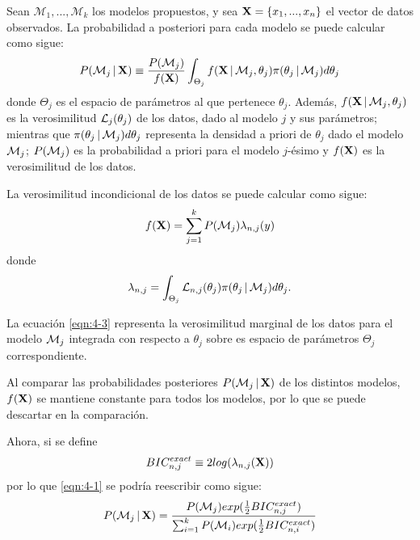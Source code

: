 Sean $\mathcal{M}_1, ..., \mathcal{M}_k$ los modelos propuestos, y sea $\textbf{X} = \lbrace x_1, ..., x_n \rbrace $ el vector de datos observados. La probabilidad a posteriori para cada modelo se puede calcular como sigue: 
\begin{equation}
P(\mathcal{M}_j \,|\, \textbf{X}) \equiv \frac{P(\mathcal{M}_j)}{f(\textbf{X})} 
  \int_{\Theta_j} f(\textbf{X} \,|\, \mathcal{M}_j, \theta_j) \pi(\theta_j \,|\, \mathcal{M}_j) d\theta_j
\label{eqn:4-1}
\end{equation}
donde $\Theta_j$ es el espacio de parámetros al que pertenece $\theta_j$. Además, $f(\textbf{X} \,|\, \mathcal{M}_j, \theta_j)$ es la verosimilitud $\mathcal{L}_{j}(\theta_j)$ de los datos, dado al modelo $j$ y sus parámetros; mientras que $ \pi(\theta_j \,|\, \mathcal{M}_j) d\theta_j$ representa la densidad a priori de $\theta_j$ dado el modelo $\mathcal{M}_j$; 
$P(\mathcal{M}_j)$ es la probabilidad a priori para el modelo $j$-ésimo y $f(\textbf{X})$ es la verosimilitud de los datos.

La verosimilitud incondicional de los datos se puede calcular como sigue: 
\begin{equation}
f(\textbf{X}) = \sum_{j=1}^k P(\mathcal{M}_j) \lambda_{n, j}(y)
\label{eqn:4-2}
\end{equation}
donde 
\begin{equation}
\lambda_{n, j} = \int_{\Theta_j} \mathcal{L}_{n, j}(\theta_j) \pi(\theta_j \,|\, \mathcal{M}_j) d\theta_j.
\label{eqn:4-3}
\end{equation}

La ecuación \eqref{eqn:4-3} representa la verosimilitud marginal de los datos para el modelo $\mathcal{M}_j$ integrada con respecto a $\theta_j$ sobre es espacio de parámetros $\Theta_j$ correspondiente.

Al comparar las probabilidades posteriores $P(\mathcal{M}_j \,|\, \textbf{X})$ de los distintos modelos, $f(\textbf{X})$ se mantiene constante para todos los modelos, por lo que se puede descartar en la comparación.

Ahora, si se define 
\begin{equation}
BIC_{n, j}^{exact} \equiv 2 log(\lambda_{n, j}(\textbf{X}))
\label{eqn:4-4}
\end{equation}
por lo que \eqref{eqn:4-1} se podría reescribir como sigue: 
\begin{equation}
P(\mathcal{M}_j \,|\, \textbf{X}) = \frac{ P(\mathcal{M}_j)  exp(\frac{1}{2} BIC_{n, j}^{exact}) }
{ \sum_{i=1}^k  P(\mathcal{M}_i) exp(\frac{1}{2} BIC_{n, i}^{exact}) }
\label{eqn:4-5}
\end{equation}

